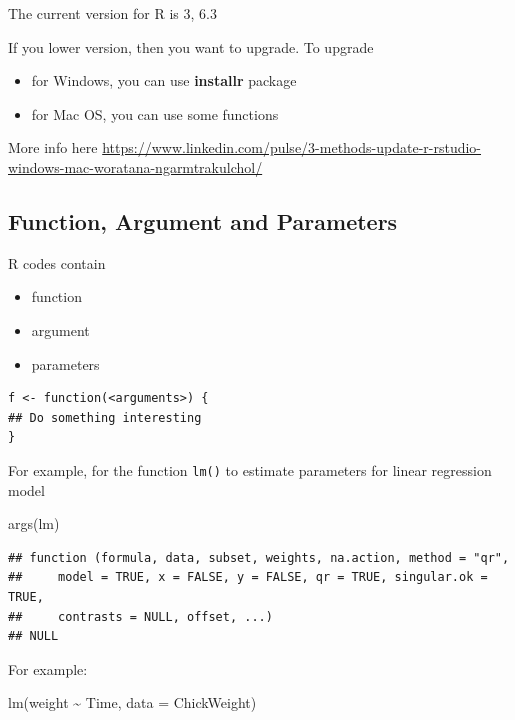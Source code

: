 \documentclass[
  10pt,
]{krantz}
\newenvironment{Shaded}{\begin{snugshade}}{\end{snugshade}}
\newcommand{\AttributeTok}[1]{\textcolor[rgb]{0.77,0.63,0.00}{#1}}
\newcommand{\FunctionTok}[1]{\textcolor[rgb]{0.00,0.00,0.00}{#1}}
\newcommand{\NormalTok}[1]{#1}
\newcommand{\SpecialCharTok}[1]{\textcolor[rgb]{0.00,0.00,0.00}{#1}}
\providecommand{\tightlist}{%
  \setlength{\itemsep}{0pt}\setlength{\parskip}{0pt}}
\begin{document}
The current version for R is 3, 6.3

If you lower version, then you want to upgrade. To upgrade

\begin{itemize}
\tightlist
\item
  for Windows, you can use \textbf{installr} package
\item
  for Mac OS, you can use some functions
\end{itemize}

More info here \url{https://www.linkedin.com/pulse/3-methods-update-r-rstudio-windows-mac-woratana-ngarmtrakulchol/}

\hypertarget{function-argument-and-parameters}{%
\subsection{Function, Argument and Parameters}\label{function-argument-and-parameters}}

R codes contain

\begin{itemize}
\tightlist
\item
  function
\item
  argument
\item
  parameters
\end{itemize}

\begin{verbatim}
f <- function(<arguments>) {
## Do something interesting
}
\end{verbatim}

For example, for the function \texttt{lm()} to estimate parameters for linear regression model

\begin{Shaded}
\begin{Highlighting}[]
\FunctionTok{args}\NormalTok{(lm)}
\end{Highlighting}
\end{Shaded}

\begin{verbatim}
## function (formula, data, subset, weights, na.action, method = "qr", 
##     model = TRUE, x = FALSE, y = FALSE, qr = TRUE, singular.ok = TRUE, 
##     contrasts = NULL, offset, ...) 
## NULL
\end{verbatim}

For example:

\begin{Shaded}
\begin{Highlighting}[]
\FunctionTok{lm}\NormalTok{(weight }\SpecialCharTok{\textasciitilde{}}\NormalTok{ Time, }\AttributeTok{data =}\NormalTok{ ChickWeight)}
\end{Highlighting}
\end{Shaded}
\end{document}

